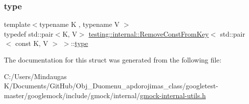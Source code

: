 \subsubsection{\texorpdfstring{type}{type}\hspace{0.1cm}{\footnotesize\ttfamily [3/3]}}
{\footnotesize\ttfamily template$<$typename K , typename V $>$ \\
typedef std\+::pair$<$K, V$>$ \mbox{\hyperlink{structtesting_1_1internal_1_1_remove_const_from_key}{testing\+::internal\+::\+Remove\+Const\+From\+Key}}$<$ std\+::pair$<$ const K, V $>$ $>$\+::\mbox{\hyperlink{structtesting_1_1internal_1_1_remove_const_from_key_3_01std_1_1pair_3_01const_01_k_00_01_v_01_4_01_4_ac1d76274964aa8172889a4714246e86f}{type}}}



The documentation for this struct was generated from the following file\+:\begin{DoxyCompactItemize}
\item 
C\+:/\+Users/\+Mindaugas K/\+Documents/\+Git\+Hub/\+Obj\+\_\+\+Duomenu\+\_\+apdorojimas\+\_\+class/googletest-\/master/googlemock/include/gmock/internal/\mbox{\hyperlink{googletest-master_2googlemock_2include_2gmock_2internal_2gmock-internal-utils_8h}{gmock-\/internal-\/utils.\+h}}\end{DoxyCompactItemize}
